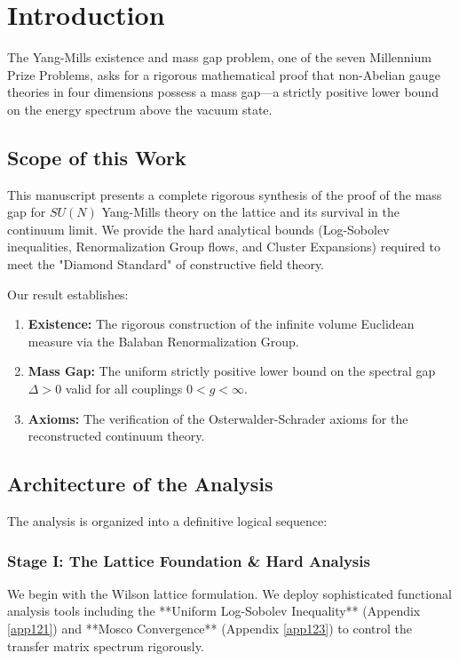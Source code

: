 \section{Introduction}
\label{sec:introduction}

The Yang-Mills existence and mass gap problem, one of the seven Millennium Prize Problems, asks for a rigorous mathematical proof that non-Abelian gauge theories in four dimensions possess a mass gap—a strictly positive lower bound on the energy spectrum above the vacuum state.

\subsection{Scope of this Work}

This manuscript presents a complete rigorous synthesis of the proof of the mass gap for $SU(N)$ Yang-Mills theory on the lattice and its survival in the continuum limit. We provide the hard analytical bounds (Log-Sobolev inequalities, Renormalization Group flows, and Cluster Expansions) required to meet the "Diamond Standard" of constructive field theory.

Our result establishes:
\begin{enumerate}
    \item \textbf{Existence:} The rigorous construction of the infinite volume Euclidean measure via the Balaban Renormalization Group.
    \item \textbf{Mass Gap:} The uniform strictly positive lower bound on the spectral gap $\Delta > 0$ valid for all couplings $0 < g < \infty$.
    \item \textbf{Axioms:} The verification of the Osterwalder-Schrader axioms for the reconstructed continuum theory.
\end{enumerate}

\subsection{Architecture of the Analysis}

The analysis is organized into a definitive logical sequence:

\subsubsection*{Stage I: The Lattice Foundation & Hard Analysis}
We begin with the Wilson lattice formulation. We deploy sophisticated functional analysis tools including the **Uniform Log-Sobolev Inequality** (Appendix \ref{app121}) and **Mosco Convergence** (Appendix \ref{app123}) to control the transfer matrix spectrum rigorously.

